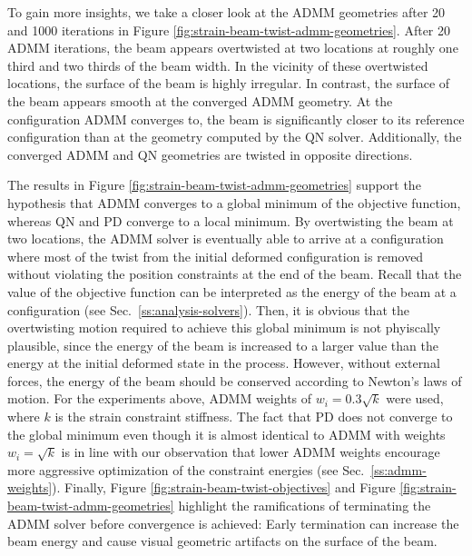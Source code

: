 To gain more insights, we take a closer look at the ADMM geometries after 20 and 1000 iterations in Figure \ref{fig:strain-beam-twist-admm-geometries}. After 20 ADMM iterations, 
the beam appears overtwisted at two locations at roughly one third and two thirds of the beam width. In the vicinity of these overtwisted locations, the surface of the 
beam is highly irregular. In contrast, the surface of the beam appears smooth at the converged ADMM geometry. At the configuration ADMM converges to, the beam is 
significantly closer to its reference configuration than at the geometry computed by the QN solver. Additionally, the converged ADMM and QN geometries are twisted in 
opposite directions.

The results in Figure \ref{fig:strain-beam-twist-admm-geometries} support the hypothesis that ADMM converges to a global minimum of the objective function, whereas QN and PD 
converge to a local minimum. By overtwisting the beam at two locations, the ADMM solver is eventually able to arrive at a configuration where most of the twist from the 
initial deformed configuration is removed without violating the position constraints at the end of the beam. Recall that the value of the objective function can be 
interpreted as the energy of the beam at a configuration (see Sec.\ \ref{ss:analysis-solvers}). Then, it is obvious that the overtwisting motion required to achieve this 
global minimum is not phyiscally plausible, since the energy of the beam is increased to a larger value than the energy at the initial deformed state in the process.
However, without external forces, the energy of the beam should be conserved according to Newton's laws of motion. For the experiments above, ADMM weights of 
$w_i = 0.3\sqrt{k}$ were used, where $k$ is the strain constraint stiffness. The fact that PD does not converge to the global minimum even though it is almost 
identical to ADMM with weights $w_i = \sqrt{k}$ is in line with our observation that lower ADMM weights encourage more aggressive optimization of the constraint 
energies (see Sec.\ \ref{ss:admm-weights}). Finally, Figure \ref{fig:strain-beam-twist-objectives} and Figure \ref{fig:strain-beam-twist-admm-geometries} highlight the ramifications
of terminating the ADMM solver before convergence is achieved: Early termination can increase the beam energy and cause visual geometric artifacts on the surface of the beam.

